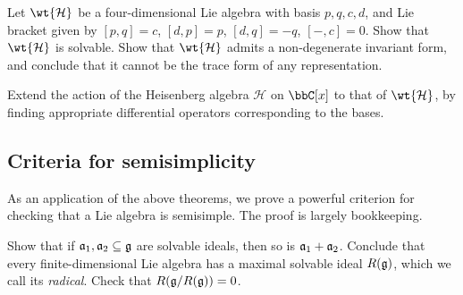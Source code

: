 \begin{exercise}
    Let $\wt{\mathcal{H}}$ be a four-dimensional Lie algebra with basis $p,q,c,d$, and
    Lie bracket given by $[p,q]=c$, $[d,p]=p$, $[d,q]=-q$, $[-,c]=0$. Show that
    $\wt{\mathcal{H}}$ is solvable. Show that $\wt{\mathcal{H}}$ admits a
    non-degenerate invariant form, and conclude that it cannot be the trace form
    of any representation. 

    Extend the action of the Heisenberg algebra
    $\mathcal{H}$ on $\bbC[x]$ to that of $\wt{\mathcal{H}}$, by finding
    appropriate differential operators corresponding to the bases.
\end{exercise}

\subsection{Criteria for semisimplicity} As an application of the above
theorems, we prove a powerful criterion for checking that a Lie algebra is
semisimple. The proof is largely bookkeeping.

\begin{exercise}
    Show that if $\mathfrak{a}_1, \mathfrak{a}_2\subseteq \mathfrak{g}$ are solvable ideals, then
    so is $\mathfrak{a}_1+\mathfrak{a}_2$. Conclude that every finite-dimensional Lie
    algebra has a maximal solvable ideal $R(\mathfrak{g})$, which we call its \emph{radical}.
    Check that $R(\mathfrak{g}/R(\mathfrak{g}))=0$.
\end{exercise}

